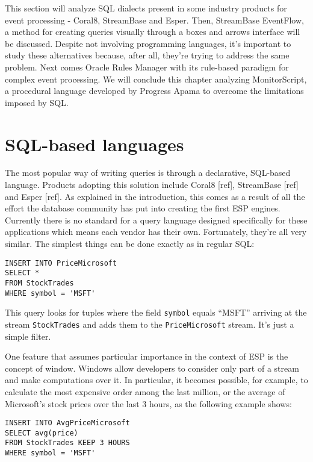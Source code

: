 \documentclass{report}
\begin{document}
This section will analyze SQL dialects present in some industry
products for event processing - Coral8, StreamBase and Esper. Then,
StreamBase EventFlow, a method for creating queries visually through a
boxes and arrows interface will be discussed. Despite not involving
programming languages, it's important to study these alternatives
because, after all, they're trying to address the same problem. Next
comes Oracle Rules Manager with its rule-based paradigm for complex
event processing. We will conclude this chapter analyzing
MonitorScript, a procedural language developed by Progress Apama to
overcome the limitations imposed by SQL.

\section{SQL-based languages}

The most popular way of writing queries is through a declarative,
SQL-based language. Products adopting this solution include Coral8
[ref], StreamBase [ref] and Esper [ref]. As explained in the
introduction, this comes as a result of all the effort the database
community has put into creating the first ESP engines. Currently there
is no standard for a query language designed specifically for these
applications which means each vendor has their own. Fortunately,
they're all very similar. The simplest things can be done exactly as
in regular SQL:

\begin{verbatim}
INSERT INTO PriceMicrosoft
SELECT *
FROM StockTrades
WHERE symbol = 'MSFT'
\end{verbatim}

This query looks for tuples where the field \verb=symbol= equals
``MSFT'' arriving at the stream \verb=StockTrades= and adds them to
the \verb=PriceMicrosoft= stream. It's just a simple filter.

One feature that assumes particular importance in the context of ESP
is the concept of window. Windows allow developers to consider only
part of a stream and make computations over it. In particular, it
becomes possible, for example, to calculate the most expensive order
among the last million, or the average of Microsoft's stock prices
over the last 3 hours, as the following example shows:

\begin{verbatim}
INSERT INTO AvgPriceMicrosoft
SELECT avg(price)
FROM StockTrades KEEP 3 HOURS
WHERE symbol = 'MSFT'
\end{verbatim}
\end{document}
